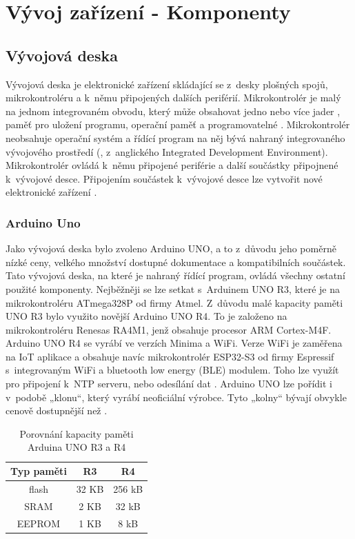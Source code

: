 \chapter{Vývoj zařízení - Komponenty}
\label{4-vyvoj-zarizeni-komponenty}
\section{Vývojová deska}
Vývojová deska je elektronické zařízení skládající se z~desky plošných spojů, mikro\-kontroléru a k~němu připojených dalších periférií. Mikrokontrolér je malý  na jednom integrovaném obvodu, který může obsahovat jedno nebo více jader , paměť pro uložení programu, operační paměť a programovatelné . Mikrokontrolér neobsahuje operační systém a řídící program na něj bývá nahraný  integrovaného vývojového prostředí (, z~anglického Integrated Develop\-ment Environment). Mikrokontrolér ovládá k~němu připojené periférie a další součástky připojnené k~vývojové desce. Připojením součástek k~vývojové desce lze vytvořit nové elektronické zařízení \cite{dps_vyvojove_desky}.

\subsection{Arduino Uno}
Jako vývojová deska bylo zvoleno Arduino UNO, a to z~důvodu jeho poměrně nízké ceny, velkého množství dostupné dokumentace a kompatibilních součástek. Tato vývojová deska, na které je nahraný řídící program, ovládá všechny ostatní použité komponenty. Nejběžněji se lze setkat s~Arduinem UNO R3, které je  na mikrokontroléru ATmega328P od firmy Atmel. Z~důvodu malé kapacity paměti  UNO R3 bylo využito novější Arduino UNO R4. To je založeno na mikrokontroléru Renesas RA4M1, jenž obsahuje procesor ARM Cortex-M4F. Arduino UNO R4 se vyrábí ve verzích Minima a WiFi. Verze WiFi je zaměřena na IoT aplikace a obsahuje navíc mikrokontrolér ESP32-S3 od firmy Espressif s~integrovaným WiFi a bluetooth low energy (BLE) modulem. Toho lze využít pro připojení k~NTP serveru, nebo odesílání dat \cite{arduino}. Arduino UNO lze pořídit i v~podobě „klonu“, který vyrábí neoficiální výrobce. Tyto „kolny“ bývají obvykle cenově dostupnější než .


\begin{table}[H]
    \centering
    \caption{Porovnání kapacity paměti Arduina UNO R3 a R4 \cite{arduino}}
    \begin{tabular}{|c|c|c|}
    \hline
    \textbf{Typ paměti} & \textbf{R3} & \textbf{R4}\\
    \hline\hline
    flash  & 32 KB & 256 kB \\ \hline
    SRAM   & 2  KB &  32 kB \\ \hline
    EEPROM & 1  KB &   8 kB \\ \hline
    \end{tabular}\\
\end{table}

